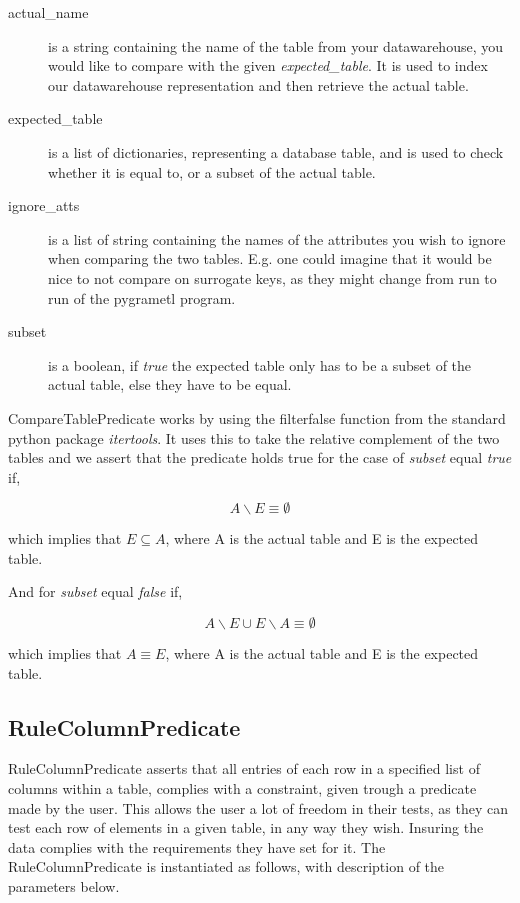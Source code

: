
\begin{description}
\item [actual\_name] is a string containing the name of the table from your datawarehouse, you would like to compare with the given \textit{expected\_table}. It is used to index our datawarehouse representation and then retrieve the actual table.
\item [expected\_table] is a list of dictionaries, representing a database table, and is used to check whether it is equal to, or a subset of the actual table.
\item [ignore\_atts] is a list of string containing the names of the attributes you wish to ignore when comparing the two tables. E.g. one could imagine that it would be nice to not compare on surrogate keys, as they might change from run to run of the pygrametl program.
  \item [subset] is a boolean, if \textit{true} the expected table only has to be a subset of the actual table, else they have to be equal.
\end{description}

CompareTablePredicate works by using the filterfalse function from the standard python package \textit{itertools}. It uses this to take the relative complement of the two tables and we assert that the predicate holds true for the case of \textit{subset} equal \textit{true} if,

\[ A \backslash E \equiv \emptyset \]

\noindent which implies that $E \subseteq A$, where A is the actual table and E is the expected table.

And for \textit{subset} equal \textit{false} if,

\[ A \backslash E \cup E \backslash A \equiv \emptyset \]

\noindent which implies that $A \equiv E$, where A is the actual table and E is the expected table.

\subsection{RuleColumnPredicate}

RuleColumnPredicate asserts that all entries of each row in a specified list of columns within a table, complies with a constraint, given trough a predicate made by the user. This allows the user a lot of freedom in their tests, as they can test each row of elements in a given table, in any way they wish. Insuring the data complies with the requirements they have set for it. The RuleColumnPredicate is instantiated as follows, with description of the parameters below.

